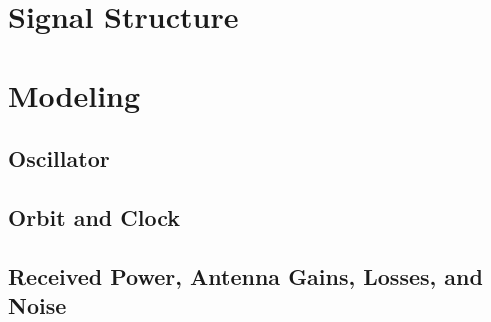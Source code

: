 \documentclass{article}
\begin{document}


\section{Signal Structure}


\section{Modeling}

\subsection{Oscillator}

\subsection{Orbit and Clock}

\subsection{Received Power, Antenna Gains, Losses, and Noise}





\end{document}
